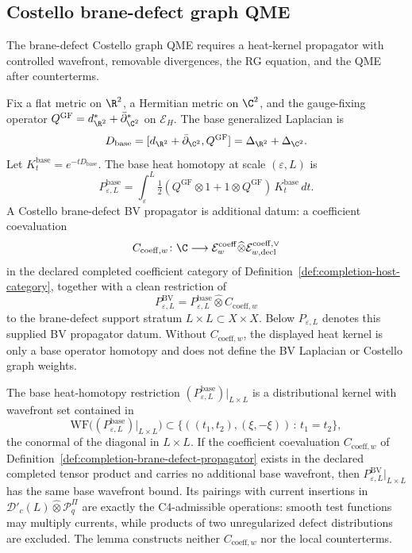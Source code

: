 \subsection{Costello brane-defect graph QME}
\label{ssec:completion-graph-qme}

The brane-defect Costello graph QME requires a heat-kernel
propagator with controlled wavefront, removable divergences, the
RG equation, and the QME after counterterms.

\begin{defn}
\label{def:completion-brane-defect-propagator}
Fix a flat metric on \(\R^2\), a Hermitian metric on \(\C^2\), and
the gauge-fixing operator
\(Q^{\mathrm{GF}}=d^*_{\R^2}+\bar\partial^*_{\C^2}\) on
\(\mathcal E_H\).  The base generalized Laplacian is
\[
  D_{\mathrm{base}}
  =[d_{\R^2}+\bar\partial_{\C^2},Q^{\mathrm{GF}}]
  =\Delta_{\R^2}+\Delta_{\C^2}.
\]
Let \(K^{\mathrm{base}}_t=e^{-tD_{\mathrm{base}}}\).  The base heat
homotopy at scale \((\varepsilon,L)\) is
\[
  P^{\mathrm{base}}_{\varepsilon,L}=\int_\varepsilon^L
   \tfrac12(Q^{\mathrm{GF}}\otimes 1+1\otimes Q^{\mathrm{GF}})\,
   K^{\mathrm{base}}_t\,dt .
\]
A Costello brane-defect BV propagator is additional datum:
a coefficient coevaluation
\[
  C_{\mathrm{coeff},w}\colon
  \C\longrightarrow
  \mathcal E^{\mathrm{coeff}}_w
  \widehat\otimes
  \mathcal E^{\mathrm{coeff},\vee}_{w,\mathrm{decl}}
\]
in the declared completed coefficient category of
Definition~\ref{def:completion-host-category}, together with a clean
restriction of
\[
  P^{\mathrm{BV}}_{\varepsilon,L}
  =
  P^{\mathrm{base}}_{\varepsilon,L}\widehat\otimes
  C_{\mathrm{coeff},w}
\]
to the brane-defect support stratum \(L\times L\subset X\times X\).
Below \(P_{\varepsilon,L}\) denotes this supplied BV propagator datum.
Without \(C_{\mathrm{coeff},w}\), the displayed heat kernel is only a
base operator homotopy and does not define the BV Laplacian or Costello
graph weights.
\end{defn}

\begin{lem}
\label{thm:completion-wavefront-control}
The base heat-homotopy restriction
\((P^{\mathrm{base}}_{\varepsilon,L})|_{L\times L}\) is a
distributional kernel with wavefront set contained in
\[
  \mathrm{WF}\bigl((P^{\mathrm{base}}_{\varepsilon,L})|_{L\times L}\bigr)
  \subset
  \{((t_1,t_2),(\xi,-\xi))\,:\,t_1=t_2\},
\]
the conormal of the diagonal in \(L\times L\).  If the coefficient
coevaluation \(C_{\mathrm{coeff},w}\) of
Definition~\ref{def:completion-brane-defect-propagator} exists in the
declared completed tensor product and carries no additional base
wavefront, then \(P^{\mathrm{BV}}_{\varepsilon,L}|_{L\times L}\) has
the same base wavefront bound.  Its pairings with current insertions in
\(\mathcal D'_c(L)\widehat\otimes\mathcal P^\Pi_q\) are exactly the
C4-admissible operations: smooth test functions may multiply currents,
while products of two unregularized defect distributions are excluded.
The lemma constructs neither \(C_{\mathrm{coeff},w}\) nor the local
counterterms.
\end{lem}

